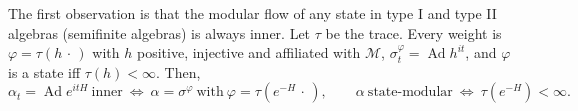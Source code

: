 \documentclass[a4paper,11pt]{article}
\newtheorem{theorem}{Theorem}
\theoremstyle{definition}
\begin{document}
The first observation is that the modular flow of any state in type I and type II algebras (semifinite algebras) is always inner. Let $\tau$ be the trace. Every weight is $\varphi=\tau(h\,\cdot\,)$ with $h$ positive, injective and affiliated with $\mathcal M$, $\sigma^\varphi_t=\operatorname{Ad}h^{it}$, and $\varphi$ is a state iff $\tau(h)<\infty$. Then,
\begin{equation}
 \alpha_t=\operatorname{Ad}e^{itH}\ \text{inner}
 \ \Longleftrightarrow\ \alpha=\sigma^{\varphi}\ \text{with}\ \varphi=\tau(e^{-H}\,\cdot\,),
 \qquad
 \alpha\ \text{state-modular}\ \Longleftrightarrow\ \tau(e^{-H})<\infty .
 \label{eq:semifinite-dictionary}
\end{equation}
\end{document}

